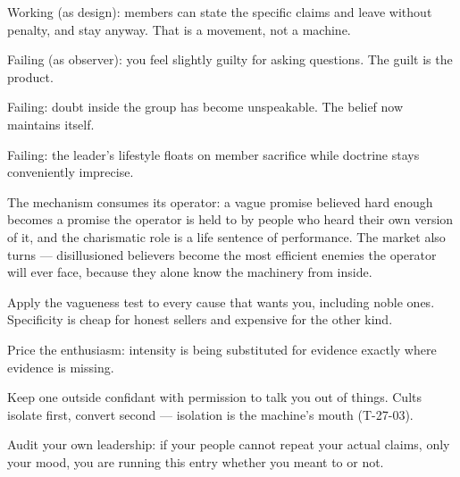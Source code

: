 \begin{feedback}
  \item Working (as design): members can state the specific claims and leave without penalty, and stay anyway. That is a movement, not a machine.
  \item Failing (as observer): you feel slightly guilty for asking questions. The guilt is the product.
  \item Failing: doubt inside the group has become unspeakable. The belief now maintains itself.
  \item Failing: the leader's lifestyle floats on member sacrifice while doctrine stays conveniently imprecise.
\end{feedback}
\begin{failure}
The mechanism consumes its operator: a vague promise believed hard enough becomes a promise the operator is held to by people who heard their own version of it, and the charismatic role is a life sentence of performance. The market also turns --- disillusioned believers become the most efficient enemies the operator will ever face, because they alone know the machinery from inside.
\end{failure}
\begin{countermeasures}
  \item Apply the vagueness test to every cause that wants you, including noble ones. Specificity is cheap for honest sellers and expensive for the other kind.
  \item Price the enthusiasm: intensity is being substituted for evidence exactly where evidence is missing.
  \item Keep one outside confidant with permission to talk you out of things. Cults isolate first, convert second --- isolation is the machine's mouth (T-27-03).
  \item Audit your own leadership: if your people cannot repeat your actual claims, only your mood, you are running this entry whether you meant to or not.
\end{countermeasures}

\seesources
{}
